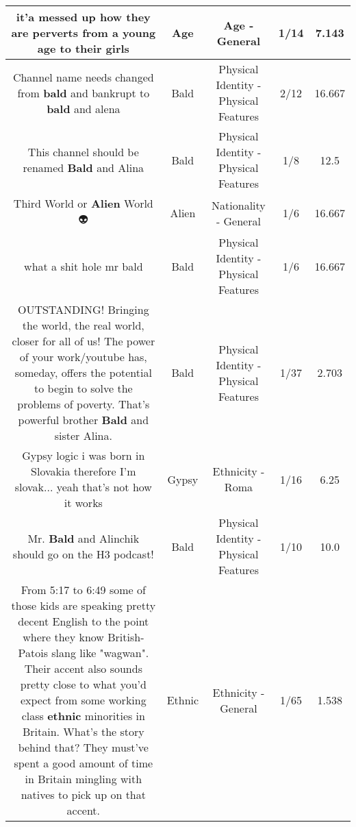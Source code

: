 \documentclass[11pt]{article}
\newlength\mylength
\begin{document}
\begin{center}
\begin{longtable}{|C{.65\mylength}|C{.30\mylength}|C{.12\mylength}|C{.12\mylength}|C{.12\mylength}|}
  \small it'a messed up how they are perverts from a young \textbf{age} to their girls\normalsize   & Age & Age - General & 1/14 & 7.143 \\  \hline
  \small Channel name needs changed from \textbf{bald} and bankrupt to \textbf{bald} and alena\normalsize   & Bald & Physical Identity - Physical Features & 2/12 & 16.667 \\  \hline
  \small This channel should be renamed \textbf{Bald} and Alina\normalsize   & Bald & Physical Identity - Physical Features & 1/8 & 12.5 \\  \hline
  \small Third World or \textbf{Alien} World 👽\normalsize   & Alien & Nationality - General & 1/6 & 16.667 \\  \hline
  \small what a shit hole mr bald\normalsize   & Bald & Physical Identity - Physical Features & 1/6 & 16.667 \\  \hline
  \small OUTSTANDING!  Bringing the world, the real world, closer for all of us!  The power of your work/youtube has, someday,  offers the potential to begin to solve the problems of poverty.  That's powerful brother \textbf{Bald} and sister Alina.\normalsize   & Bald & Physical Identity - Physical Features & 1/37 & 2.703 \\  \hline
  \small Gypsy logic i was born in Slovakia therefore I'm slovak... yeah that's not how it works\normalsize   & Gypsy & Ethnicity - Roma & 1/16 & 6.25 \\  \hline
  \small Mr. \textbf{Bald} and Alinchik should go on the H3 podcast!\normalsize   & Bald & Physical Identity - Physical Features & 1/10 & 10.0 \\  \hline
  \small From 5:17 to 6:49 some of those kids are speaking pretty decent English to the point where they know British-Patois slang like "wagwan". Their accent also sounds pretty close to what you'd expect from some working class \textbf{ethnic} minorities in Britain. What's the story behind that? They must've spent a good amount of time in Britain mingling with natives to pick up on that accent.\normalsize   & Ethnic & Ethnicity - General & 1/65 & 1.538 \\  \hline

\end{longtable}
\end{center}
\end{document}
